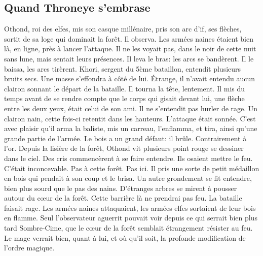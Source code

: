 \subsection{Quand Throneye s'embrase}
Othond, roi des elfes, mis son casque millénaire, pris son arc d'if, ses flèches, sortit de sa loge qui dominait la forêt. Il observa. Les armées naines étaient bien là, en ligne, près à lancer l’attaque. Il ne les voyait pas, dans le noir de cette nuit sans lune, mais sentait leurs présences. Il leva le bras: les arcs se bandèrent.
\newline
Il le baissa, les arcs tirèrent.
\newline
Khori, sergent du 5ème bataillon, entendit plusieurs bruits secs. Une masse s'effondra à côté de lui. Étrange, il n'avait entendu aucun clairon sonnant le départ de la bataille. Il tourna la tête, lentement. Il mis du temps avant de se rendre compte que le corps qui gisait devant lui, une flèche entre les deux yeux, était celui de son ami. Il ne s'entendit pas hurler de rage. Un clairon nain, cette fois-ci retentit dans les hauteurs. L'attaque était sonnée. C'est avec plaisir qu'il arma la baliste, mis un carreau, l’enflamma, et tira, ainsi qu'une grande partie de l'armée. Le bois a un grand défaut: il brûle. Contrairement à l'or.
\newline
Depuis la lisière de la forêt, Othond vit plusieurs point rouge se dessiner dans le ciel. Des cris commencèrent à se faire entendre. Ils osaient mettre le feu. C'était inconcevable. Pas à cette forêt. Pas ici. Il pris une sorte de petit médaillon en bois qui pendait à son coup et le brisa. Un autre grondement se fit entendre, bien plus sourd que le pas des nains. D'étranges arbres se mirent à pousser autour du cœur de la forêt. Cette barrière là ne prendrai pas feu.
\newline
La bataille faisait rage. Les armées naines attaquaient, les armées elfes sortaient de leur bois en flamme. Seul l'observateur aguerrit pouvait voir depuis ce qui serrait bien plus tard Sombre-Cime, que le cœur de la forêt semblait étrangement résister au feu. Le mage verrait bien, quant à lui, et où qu'il soit, la profonde modification de l'ordre magique.

